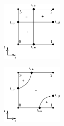 \documentclass{beamer}
\begin{document}
\begin{frame}
\begin{figure}[!hbp]
\begin{subfigure}{0.32\textwidth}
		\centering
		\includegraphics[width=1.2in]{opp_neg_block_pdt_int} 
	\end{subfigure}
	\begin{subfigure}{0.32\textwidth}
	\centering
		\includegraphics[width=1.2in]{opp_neg_more_neg_pdt_int}
	\end{subfigure}
\end{figure}

\end{frame}
\end{document}
